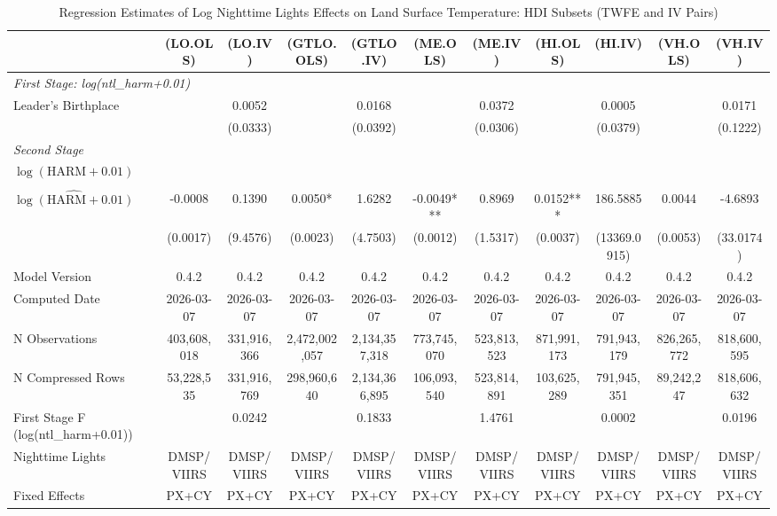 \begin{table}[htbp]
\centering
\tiny
\caption{Regression Estimates of Log Nighttime Lights Effects on Land Surface Temperature: HDI Subsets (TWFE and IV Pairs)}
\begin{tabular}{lcccccccccc}
\toprule
 & (LO.OLS) & (LO.IV) & (GTLO.OLS) & (GTLO.IV) & (ME.OLS) & (ME.IV) & (HI.OLS) & (HI.IV) & (VH.OLS) & (VH.IV) \\
\midrule
\midrule
\multicolumn{11}{l}{\textit{First Stage: log(ntl\_harm+0.01)}} \\
  Leader's Birthplace &  & 0.0052 &  & 0.0168 &  & 0.0372 &  & 0.0005 &  & 0.0171 \\
 &  & (0.0333) &  & (0.0392) &  & (0.0306) &  & (0.0379) &  & (0.1222) \\
\midrule
\multicolumn{11}{l}{\textit{Second Stage}} \\
$\log(\text{HARM} + 0.01)$ &  &  &  &  &  &  &  &  &  &  \\
 &  &  &  &  &  &  &  &  &  &  \\
$\hat{\log(\text{HARM} + 0.01)}$ & -0.0008 & 0.1390 & 0.0050* & 1.6282 & -0.0049*** & 0.8969 & 0.0152*** & 186.5885 & 0.0044 & -4.6893 \\
 & (0.0017) & (9.4576) & (0.0023) & (4.7503) & (0.0012) & (1.5317) & (0.0037) & (13369.0915) & (0.0053) & (33.0174) \\
\midrule
Model Version & 0.4.2 & 0.4.2 & 0.4.2 & 0.4.2 & 0.4.2 & 0.4.2 & 0.4.2 & 0.4.2 & 0.4.2 & 0.4.2 \\
Computed Date & 2026-03-07 & 2026-03-07 & 2026-03-07 & 2026-03-07 & 2026-03-07 & 2026-03-07 & 2026-03-07 & 2026-03-07 & 2026-03-07 & 2026-03-07 \\
N Observations & 403,608,018 & 331,916,366 & 2,472,002,057 & 2,134,357,318 & 773,745,070 & 523,813,523 & 871,991,173 & 791,943,179 & 826,265,772 & 818,600,595 \\
N Compressed Rows & 53,228,535 & 331,916,769 & 298,960,640 & 2,134,366,895 & 106,093,540 & 523,814,891 & 103,625,289 & 791,945,351 & 89,242,247 & 818,606,632 \\
First Stage F (log(ntl\_harm+0.01)) &  & 0.0242 &  & 0.1833 &  & 1.4761 &  & 0.0002 &  & 0.0196 \\
\midrule
Nighttime Lights & DMSP/VIIRS & DMSP/VIIRS & DMSP/VIIRS & DMSP/VIIRS & DMSP/VIIRS & DMSP/VIIRS & DMSP/VIIRS & DMSP/VIIRS & DMSP/VIIRS & DMSP/VIIRS \\
Fixed Effects & PX+CY & PX+CY & PX+CY & PX+CY & PX+CY & PX+CY & PX+CY & PX+CY & PX+CY & PX+CY \\

\end{tabular}
\end{table}
